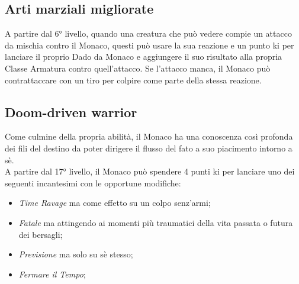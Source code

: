 \documentclass[letterpaper,twocolumn,openany,nodeprecatedcode]{dndbook}
\begin{document}
\subsection{Arti marziali migliorate}
A partire dal 6° livello, quando una creatura che può vedere compie un attacco da mischia contro il Monaco, questi può usare la sua reazione e un punto ki per lanciare il proprio Dado da Monaco e aggiungere il suo risultato alla propria Classe Armatura contro quell'attacco. Se l'attacco manca, il Monaco può contrattaccare con un tiro per colpire come parte della stessa reazione.

\subsection{}

\subsection{Doom-driven warrior}
Come culmine della propria abilità, il Monaco ha una conoscenza così profonda dei fili del destino da poter dirigere il flusso del fato a suo piacimento intorno a sè.\\
A partire dal 17° livello, il Monaco può spendere 4 punti ki per lanciare uno dei seguenti incantesimi con le opportune modifiche:\begin{itemize}
    \item \textit{Time Ravage} ma come effetto su un colpo senz'armi;\\
    \item \textit{Fatale} ma attingendo ai momenti più traumatici della vita passata o futura dei bersagli;\\
    \item \textit{Previsione} ma solo su sè stesso;\\
    \item \textit{Fermare il Tempo};
\end{itemize}
\end{document}
